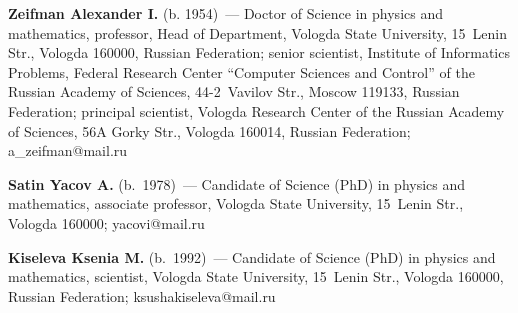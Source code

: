  


\Contr

\noindent
\textbf{Zeifman Alexander I.} (b. 1954)~--- 
Doctor of Science in physics and mathematics, professor, 
Head of Department, Vologda State University, 15~Lenin Str., Vologda 160000, 
Russian Federation; 
senior scientist, Institute of Informatics Problems, Federal Research Center 
``Computer Sciences and Control'' of the Russian Academy of Sciences, 44-2~Vavilov 
Str., Moscow 119133, Russian Federation; 
principal scientist, Vologda Research Center of the Russian Academy of Sciences,
56A Gorky Str., Vologda 160014, Russian
Federation; \mbox{a\_zeifman@mail.ru}

\vspace*{3pt}

\noindent
\textbf{Satin Yacov A.} (b.\ 1978)~--- 
Candidate of Science (PhD) in physics and mathematics, associate professor, 
Vologda State University, 15~Lenin Str., Vologda 160000; \mbox{yacovi@mail.ru}

\vspace*{3pt}

\noindent
\textbf{Kiseleva Ksenia M.} (b.\ 1992)~--- 
Candidate of Science (PhD) in physics and mathematics, scientist, 
Vologda State University, 15~Lenin Str., Vologda 160000, Russian Federation; 
\mbox{ksushakiseleva@mail.ru}
\label{end\stat}

\renewcommand{\bibname}{\protect\rm Литература}  